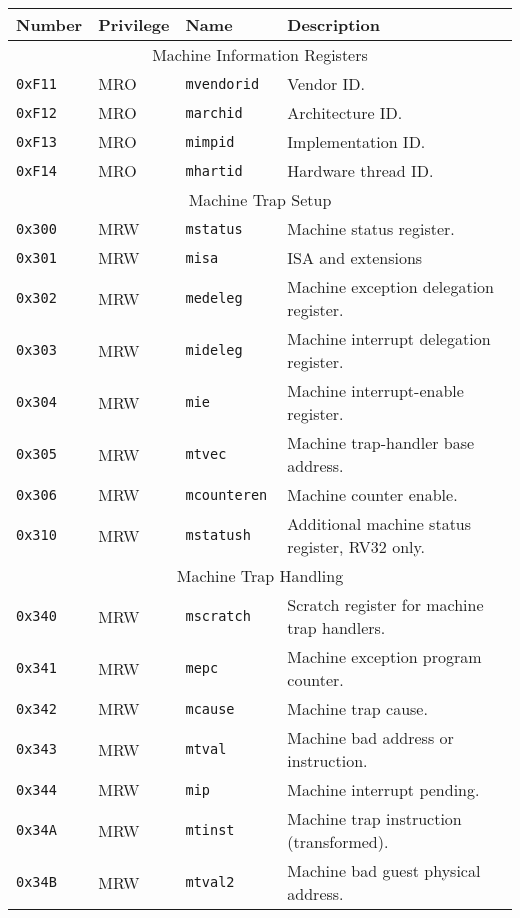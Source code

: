 \begin{table}[htb!]
\begin{center}
\begin{tabular}{|l|l|l|l|}
\hline
Number    & Privilege & Name & Description \\
\hline
\multicolumn{4}{|c|}{Machine Information Registers} \\
\hline
\tt 0xF11 & MRO &\tt mvendorid   & Vendor ID. \\
\tt 0xF12 & MRO &\tt marchid     & Architecture ID. \\
\tt 0xF13 & MRO &\tt mimpid      & Implementation ID. \\
\tt 0xF14 & MRO &\tt mhartid     & Hardware thread ID. \\
\hline
\multicolumn{4}{|c|}{Machine Trap Setup} \\
\hline
\tt 0x300 & MRW  &\tt mstatus    & Machine status register. \\
\tt 0x301 & MRW  &\tt misa       & ISA and extensions \\
\tt 0x302 & MRW  &\tt medeleg    & Machine exception delegation register. \\
\tt 0x303 & MRW  &\tt mideleg    & Machine interrupt delegation register. \\
\tt 0x304 & MRW  &\tt mie        & Machine interrupt-enable register. \\
\tt 0x305 & MRW  &\tt mtvec      & Machine trap-handler base address. \\
\tt 0x306 & MRW  &\tt mcounteren & Machine counter enable. \\
\tt 0x310 & MRW  &\tt mstatush   & Additional machine status register, RV32 only. \\
\hline
\multicolumn{4}{|c|}{Machine Trap Handling} \\
\hline
\tt 0x340 & MRW  &\tt mscratch   & Scratch register for machine trap handlers. \\
\tt 0x341 & MRW  &\tt mepc       & Machine exception program counter. \\
\tt 0x342 & MRW  &\tt mcause     & Machine trap cause. \\
\tt 0x343 & MRW  &\tt mtval      & Machine bad address or instruction. \\
\tt 0x344 & MRW  &\tt mip        & Machine interrupt pending. \\
\tt 0x34A & MRW  &\tt mtinst     & Machine trap instruction (transformed). \\
\tt 0x34B & MRW  &\tt mtval2     & Machine bad guest physical address. \\

\end{tabular}
\end{center}
\end{table}

